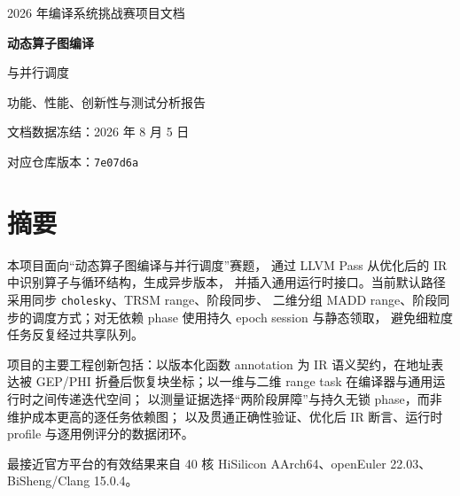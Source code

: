 \documentclass[UTF8,a4paper,openany,11pt,fontset=fandol]{ctexrep}
\begin{document}
\hypersetup{pageanchor=false}
\begin{titlepage}
  \pagecolor{Primary}
  \color{white}
  \vspace*{2.0cm}
  {\Large 2026 年编译系统挑战赛项目文档\par}
  \vspace{1.2cm}
  {\fontsize{34}{44}\selectfont\bfseries
    动态算子图编译\par
    与并行调度\par}
  \vspace{0.8cm}
  {\LARGE 功能、性能、创新性与测试分析报告\par}
  \vfill
  \vfill
  {\large 文档数据冻结：2026 年 8 月 5 日\par}
  {\large 对应仓库版本：\texttt{7e07d6a}\par}
  \vspace{0.8cm}
\end{titlepage}
\nopagecolor
\color{black}

\hypersetup{pageanchor=true}
\chapter*{摘要}

本项目面向“动态算子图编译与并行调度”赛题，
通过 LLVM Pass 从优化后的 IR 中识别算子与循环结构，生成异步版本，
并插入通用运行时接口。当前默认路径采用同步 \texttt{cholesky}、TRSM range、阶段同步、
二维分组 MADD range、阶段同步的调度方式；对无依赖 phase 使用持久 epoch session 与静态领取，
避免细粒度任务反复经过共享队列。

项目的主要工程创新包括：以版本化函数 annotation 为 IR 语义契约，在地址表达被
GEP/PHI 折叠后恢复块坐标；以一维与二维 range task 在编译器与通用运行时之间传递迭代空间；
以测量证据选择“两阶段屏障”与持久无锁 phase，而非维护成本更高的逐任务依赖图；
以及贯通正确性验证、优化后 IR 断言、运行时 profile 与逐用例评分的数据闭环。

最接近官方平台的有效结果来自 40 核 HiSilicon AArch64、openEuler 22.03、
 BiSheng/Clang 15.0.4。
\end{document}
